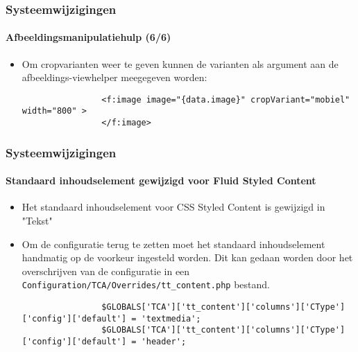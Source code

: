 \begin{frame}[fragile]
	\frametitle{Systeemwijzigingen}
	\framesubtitle{Afbeeldingsmanipulatiehulp (6/6)}

	\lstset{basicstyle=\smaller\ttfamily}

	\begin{itemize}
		\item Om cropvarianten weer te geven kunnen de varianten als argument aan de afbeeldings-viewhelper
		 	meegegeven worden:

			\begin{lstlisting}
				<f:image image="{data.image}" cropVariant="mobiel" width="800" >
				</f:image>
			\end{lstlisting}

	\end{itemize}

\end{frame}


\begin{frame}[fragile]
	\frametitle{Systeemwijzigingen}
	\framesubtitle{Standaard inhoudselement gewijzigd voor Fluid Styled Content}

	\lstset{basicstyle=\tiny\ttfamily}

	\begin{itemize}
		\item Het standaard inhoudselement voor CSS Styled Content is gewijzigd in "Tekst"
		\item Om de configuratie terug te zetten moet het standaard inhoudselement handmatig op de voorkeur ingesteld worden.
		 	Dit kan gedaan worden door het overschrijven van de configuratie in een
		 	\texttt{Configuration/TCA/Overrides/tt\_content.php} bestand.

			\begin{lstlisting}
				$GLOBALS['TCA']['tt_content']['columns']['CType']['config']['default'] = 'textmedia';
				$GLOBALS['TCA']['tt_content']['columns']['CType']['config']['default'] = 'header';
			\end{lstlisting}

	\end{itemize}

\end{frame}


